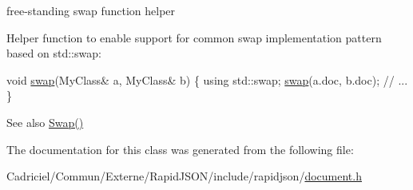free-\/standing swap function helper 

Helper function to enable support for common swap implementation pattern based on {\ttfamily std\+::swap\+:} 
\begin{DoxyCode}
\textcolor{keywordtype}{void} \hyperlink{class_generic_document_a0d63efcc43758ac3aed77e868233369d}{swap}(MyClass& a, MyClass& b) \{
    \textcolor{keyword}{using} std::swap;
    \hyperlink{class_generic_document_a0d63efcc43758ac3aed77e868233369d}{swap}(a.doc, b.doc);
    \textcolor{comment}{// ...}
\}
\end{DoxyCode}
 \begin{DoxySeeAlso}{See also}
\hyperlink{class_generic_document_a6290e1290fad74177625af5938c0c58f}{Swap()} 
\end{DoxySeeAlso}


The documentation for this class was generated from the following file\+:\begin{DoxyCompactItemize}
\item 
Cadriciel/\+Commun/\+Externe/\+Rapid\+J\+S\+O\+N/include/rapidjson/\hyperlink{document_8h}{document.\+h}\end{DoxyCompactItemize}

